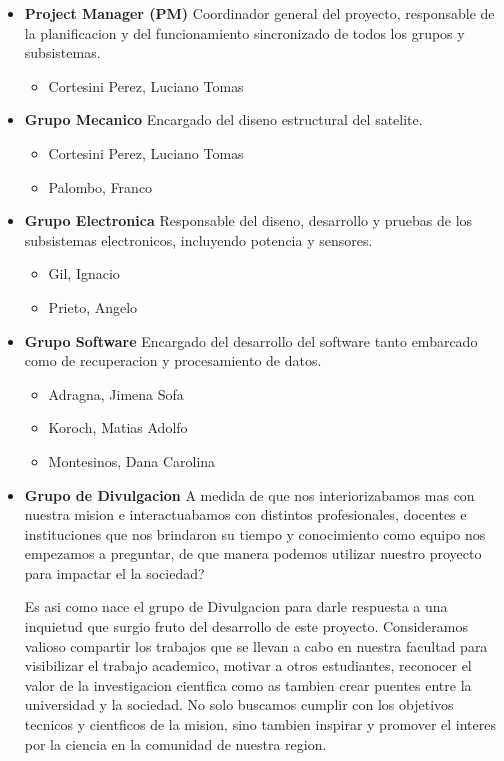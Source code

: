       \begin{itemize}
        \item \textbf{Project Manager (PM)}
          Coordinador general del proyecto, responsable de la planificacion y del funcionamiento
          sincronizado de todos los grupos y subsistemas.
          \begin{itemize}
            \item Cortesini Perez, Luciano Tomas
          \end{itemize}
        \item \textbf{Grupo Mecanico}
         Encargado del diseno estructural del satelite.
          \begin{itemize}
            \item Cortesini Perez, Luciano Tomas
            \item Palombo, Franco
          \end{itemize}
        \item \textbf{Grupo Electronica}
          Responsable del diseno, desarrollo y pruebas de los subsistemas electronicos, incluyendo
          potencia y sensores.
          \begin{itemize}
            \item Gil, Ignacio
            \item Prieto, Angelo
          \end{itemize}
          \item \textbf{Grupo Software}
          Encargado del desarrollo del software tanto embarcado como de recuperacion y procesamiento de datos.
          \begin{itemize}
            \item Adragna, Jimena Sofa
            \item Koroch, Matias Adolfo
            \item Montesinos, Dana Carolina
          \end{itemize}
        \item \textbf{Grupo de Divulgacion}
          A medida de que nos interiorizabamos mas con nuestra mision e interactuabamos con
          distintos profesionales, docentes e instituciones que nos brindaron su tiempo y conocimiento
          como equipo nos empezamos a preguntar, de que manera podemos utilizar
          nuestro proyecto para impactar el la sociedad?

          Es asi como nace el grupo de Divulgacion para darle respuesta a una inquietud que
          surgio fruto del desarrollo de este proyecto. Consideramos valioso compartir los trabajos
          que se llevan a cabo en nuestra facultad para visibilizar el trabajo academico, motivar
          a otros estudiantes, reconocer el valor de la investigacion cientfica como as tambien
          crear puentes entre la universidad y la sociedad. No solo buscamos cumplir con los
          objetivos tecnicos y cientficos de la mision, sino tambien inspirar y promover el interes
          por la ciencia en la comunidad de nuestra region.


\end{itemize}
